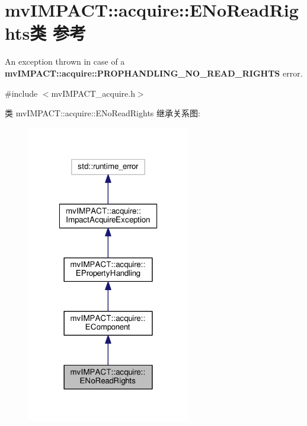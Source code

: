 \hypertarget{classmv_i_m_p_a_c_t_1_1acquire_1_1_e_no_read_rights}{\section{mv\+I\+M\+P\+A\+C\+T\+:\+:acquire\+:\+:E\+No\+Read\+Rights类 参考}
\label{classmv_i_m_p_a_c_t_1_1acquire_1_1_e_no_read_rights}
}


An exception thrown in case of a {\bfseries mv\+I\+M\+P\+A\+C\+T\+::acquire\+::\+P\+R\+O\+P\+H\+A\+N\+D\+L\+I\+N\+G\+\_\+\+N\+O\+\_\+\+R\+E\+A\+D\+\_\+\+R\+I\+G\+H\+T\+S} error.  




{\ttfamily \#include $<$mv\+I\+M\+P\+A\+C\+T\+\_\+acquire.\+h$>$}



类 mv\+I\+M\+P\+A\+C\+T\+:\+:acquire\+:\+:E\+No\+Read\+Rights 继承关系图\+:
\nopagebreak
\begin{figure}[H]
\begin{center}
\leavevmode
\includegraphics[width=202pt]{classmv_i_m_p_a_c_t_1_1acquire_1_1_e_no_read_rights__inherit__graph}
\end{center}
\end{figure}


